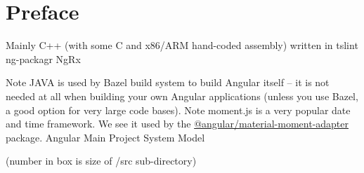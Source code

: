 \chapter{Preface}

Mainly C++ (with some C and x86/ARM hand-coded assembly)
written in
tslint
ng-packagr
NgRx

Note JAVA is used by Bazel build system to build Angular itself – it is not needed at all
when building your own Angular applications (unless you use Bazel, a good option for
very large code bases). Note moment.js is a very popular date and time framework.
We see it used by the
\url{@angular/material-moment-adapter}
package.
Angular Main Project System Model

(number in box is size of /src sub-directory)












